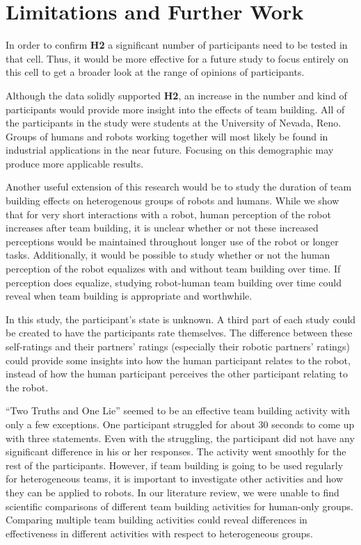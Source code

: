 \documentclass{acm_proc_article-sp}
\begin{document}
\section{Limitations and Further Work}
\label{section:limitations-and-further-work}
In order to confirm \textbf{H2} a significant number of participants need to be tested in that cell. Thus, it would be more effective for a future study to focus entirely on this cell to get a broader look at the range of opinions of participants.

Although the data solidly supported \textbf{H2}, an increase in the number and kind of participants would provide more insight into the effects of team building. All of the participants in the study were students at the University of Nevada, Reno. Groups of humans and robots working together will most likely be found in industrial applications in the near future. Focusing on this demographic may produce more applicable results. 

Another useful extension of this research would be to study the duration of team building effects on heterogenous groups of robots and humans. While we show that for very short interactions with a robot, human perception of the robot increases after team building, it is unclear whether or not these increased perceptions would be maintained throughout longer use of the robot or longer tasks. Additionally, it would be possible to study whether or not the human perception of the robot equalizes with and without team building over time. If perception does equalize, studying robot-human team building over time could reveal when team building is appropriate and worthwhile. 

In this study, the participant's state is unknown. A third part of each study could be created to have the participants rate themselves. The difference between these self-ratings and their partners' ratings (especially their robotic partners' ratings) could provide some insights into how the human participant relates to the robot, instead of how the human participant perceives the other participant relating to the robot. 

``Two Truths and One Lie'' seemed to be an effective team building activity with only a few exceptions. One participant struggled for about 30 seconds to come up with three statements. Even with the struggling, the participant did not have any significant difference in his or her responses. The activity went smoothly for the rest of the participants. However, if team building is going to be used regularly for heterogeneous teams, it is important to investigate other activities and how they can be applied to robots. In our literature review, we were unable to find scientific comparisons of different team building activities for human-only groups. Comparing multiple team building activities could reveal differences in effectiveness in different activities with respect to heterogeneous groups.
\end{document}
